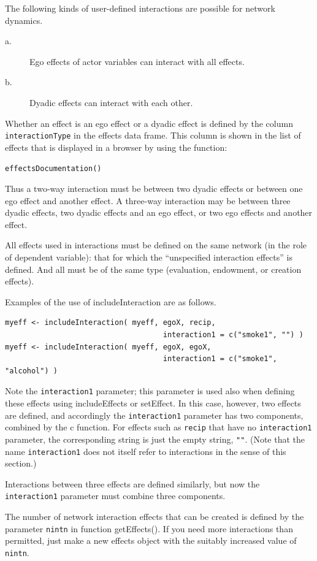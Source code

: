 \documentclass[a4paper,fleqn,11pt]{article}
\newcommand{\+}{\, + \,}
\newcommand{\sfn}[1]{\textsf{#1}}
\begin{document}
The following kinds of user-defined interactions are possible
for network dynamics.
\begin{description}
\item[a.]
  Ego effects of actor variables can interact with all effects.
  \item[b.] Dyadic effects can interact with each other.
\end{description}
Whether an effect is an ego effect or a dyadic effect is defined by
the column \texttt{interactionType} in the effects data frame.
This column is shown in the list of effects that is displayed
in a browser by using the function:

\verb|effectsDocumentation()|
\bigskip

Thus a two-way interaction must be between two dyadic effects or between one
ego effect and another effect. A three-way interaction may be between three
dyadic effects, two dyadic effects and an ego effect, or two ego effects and
another effect.

All effects used in interactions must be defined on the same network
(in the role of dependent variable): that for
which the ``unspecified
interaction effects'' is defined.  And all must be
of the same type (evaluation, endowment, or creation effects).

Examples of the use of \sfn{includeInteraction} are as follows.
\begin{verbatim}
myeff <- includeInteraction( myeff, egoX, recip,
                                    interaction1 = c("smoke1", "") )
myeff <- includeInteraction( myeff, egoX, egoX,
                                    interaction1 = c("smoke1", "alcohol") )
\end{verbatim}
Note the \texttt{interaction1} parameter; this parameter is used also
when defining these effects using \sfn{includeEffects} or
\sfn{setEffect}. In this case, however, two effects are defined,
and accordingly the \texttt{interaction1} parameter has two components,
combined by the \sfn{c} function.
For effects such as \texttt{recip} that have no \texttt{interaction1}
parameter, the corresponding string is just the empty string, \texttt{""}.
(Note that the name \texttt{interaction1} does not itself refer to interactions
in the sense of this section.)

Interactions between three effects are defined similarly,
but now the \texttt{interaction1} parameter must combine three components.

The number of network interaction effects that can be created is defined by the
parameter \texttt{nintn} in function \sfn{getEffects()}. If you need more
interactions than permitted, just make a new effects object with the
suitably increased value of \texttt{nintn}.
\end{document}
